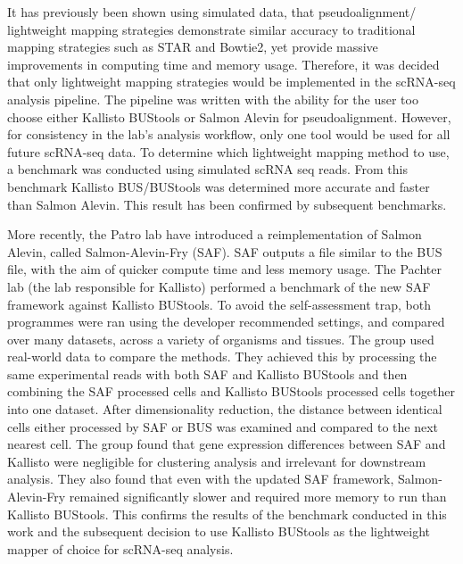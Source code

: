 It has previously been shown using simulated data, that pseudoalignment/ lightweight mapping strategies demonstrate similar accuracy to traditional mapping strategies such as STAR and Bowtie2, yet provide massive improvements in computing time and memory usage.
Therefore, it was decided that only lightweight mapping strategies would be implemented in the scRNA-seq analysis pipeline.
The pipeline was written with the ability for the user too choose either Kallisto BUStools or Salmon Alevin for pseudoalignment.
However, for consistency in the lab's analysis workflow, only one tool would be used for all future scRNA-seq data.
To determine which lightweight mapping method to use, a benchmark was conducted using simulated scRNA seq reads.
From this benchmark Kallisto BUS/BUStools was determined more accurate and faster than Salmon Alevin.
This result has been confirmed by subsequent benchmarks\cite{you2021benchmarking, melsted2019modular, melsted2019barcode}.

More recently, the Patro lab have introduced a reimplementation of Salmon Alevin, called Salmon-Alevin-Fry (SAF)\cite{sarkar2020accurate}.
SAF outputs a file similar to the BUS file, with the aim of quicker compute time and less memory usage.
The Pachter lab (the lab responsible for Kallisto) performed a benchmark of the new SAF framework against Kallisto BUStools\cite{booeshaghi2021benchmarking}.
To avoid the self-assessment trap, both programmes were ran using the developer recommended settings, and compared over many datasets, across a variety of organisms and tissues.
The group used real-world data to compare the methods.
They achieved this by processing the same experimental reads with both SAF and Kallisto BUStools and then combining the SAF processed cells and Kallisto BUStools processed cells together into one dataset.
After dimensionality reduction, the distance between identical cells either processed by SAF or BUS was examined and compared to the next nearest cell.
The group found that gene expression differences between SAF and Kallisto were negligible for clustering analysis and irrelevant for downstream analysis.
They also found that even with the updated SAF framework, Salmon-Alevin-Fry remained significantly slower and required more memory to run than Kallisto BUStools.
This confirms the results of the benchmark conducted in this work and the subsequent decision to use Kallisto BUStools as the lightweight mapper of choice for scRNA-seq analysis.

